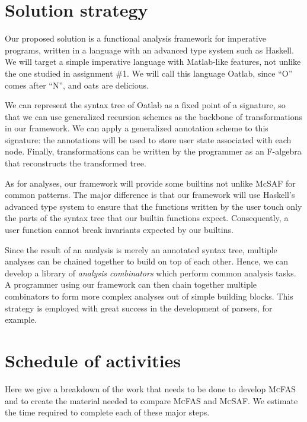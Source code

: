 \documentclass[letterpaper,11pt]{article}
\newcommand{\mcfas}{\textsc{McFAS}}
\newcommand{\mcsaf}{\textsc{McSAF}}
\begin{document}
\section{Solution strategy} \label{sec:strategy}

Our proposed solution is a functional analysis framework for imperative
programs, written in a language with an advanced type system such as Haskell.
We will target a simple imperative language with Matlab-like features, not
unlike the one studied in assignment \#1. We will call this language Oatlab,
since ``O'' comes after ``N'', and oats are delicious.

We can represent the syntax tree of Oatlab as a fixed point of a signature, so
that we can use generalized recursion schemes as the backbone of
transformations in our framework. We can apply a generalized annotation
scheme\cite{Goto} to this signature: the annotations will be used to store user
state associated with each node. Finally, transformations can be written by
the programmer as an F-algebra that reconstructs the transformed tree.

As for analyses, our framework will provide some builtins not unlike McSAF for
common patterns. The major difference is that our framework will use Haskell's
advanced type system to ensure that the functions written by the user touch
only the parts of the syntax tree that our builtin functions expect.
Consequently, a user function cannot break invariants expected by our builtins.

Since the result of an analysis is merely an annotated syntax tree, multiple
analyses can be chained together to build on top of each other. Hence, we can
develop a library of \emph{analysis combinators} which perform common analysis
tasks. A programmer using our framework can then chain together multiple
combinators to form more complex analyses out of simple building blocks. This
strategy is employed with great success in the development of parsers, for
example.

\section{Schedule of activities}

Here we give a breakdown of the work that needs to be done to develop \mcfas{}
and to create the material needed to compare \mcfas{} and \mcsaf{}. We estimate
the time required to complete each of these major steps.
\end{document}
